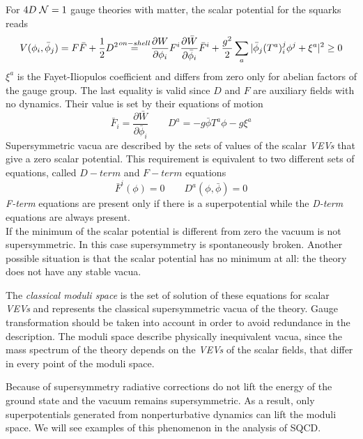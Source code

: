 For $4D \; \mathcal{N}=1$ gauge theories with matter, the scalar potential for the squarks reads
\begin{equation}
 V ( \phi_i, \bar{\phi}_j) = F \bar{F} + \frac{1}{2} D^2  \quad \overset{\mathclap{on-shell}}=   \quad \frac{\partial W}{\partial \phi_i} F^i \frac{\partial \bar{W}} {\partial \bar{\phi}_i} \bar{F}^i + \frac{g^2}{2} \sum_a | \bar{\phi}_j (T^a)^j_i \phi^j + \xi^a | ^2  \geq 0
\end{equation} 
$\xi^a$ is the Fayet-Iliopulos coefficient and differs from zero only for abelian factors of the gauge group.
The last equality is valid since $D$ and $F$ are auxiliary fields with no dynamics.
Their value is set by their equations of motion
\begin{equation}
 \bar{F}_i  = \frac{\partial \bar{W}} {\partial \bar{\phi}_i} \qquad D^a = - g \bar{\phi} T^a \phi - g \xi^a 
\end{equation}
Supersymmetric vacua are described by the sets of values of the scalar \emph{VEVs} that give a zero scalar potential. 
This requirement is equivalent to two different sets of equations, called $D-term$ and $F-term $ equations
\begin{equation}
\bar{F}^i ( \phi) = 0 \qquad D^a (\phi , \bar{\phi}) = 0
\end{equation}
\emph{F-term} equations are present only if there is a superpotential while the \emph{D-term} equations are always present.\\
If the minimum of the scalar potential is different from zero the vacuum is not supersymmetric. 
In this case supersymmetry is spontaneously broken.
Another possible situation is that the scalar potential has no minimum at all: the theory does not have any stable vacua.

The \emph{classical moduli space} is the set of solution of these equations for scalar \emph{VEVs} and represents the classical supersymmetric vacua of the theory. 
Gauge transformation should be taken into account in order to avoid redundance in the description.
The moduli space describe physically inequivalent vacua, since the mass spectrum of the theory depends on the \emph{VEVs} of the scalar fields, that differ in every point of the moduli space. 

Because of supersymmetry radiative corrections do not lift the energy of the ground state and the vacuum remains supersymmetric.
As a result, only superpotentials generated from nonperturbative dynamics can lift the moduli space. 
We will see examples of this phenomenon in the analysis of SQCD.

